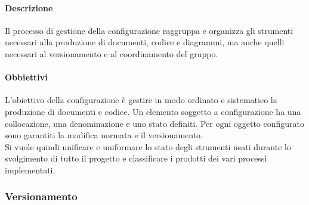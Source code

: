 			\paragraph{Descrizione}
				Il processo di gestione della configurazione raggruppa e organizza gli strumenti necessari alla produzione di documenti, codice e diagrammi, ma anche quelli necessari al versionamento e al coordinamento del gruppo.
			\paragraph{Obbiettivi}
				L’obiettivo della configurazione è gestire in modo ordinato e sistematico la produzione di documenti e codice. Un elemento soggetto a configurazione ha una collocazione, una denominazione e uno stato definiti. Per ogni oggetto configurato sono garantiti la modifica normata e il versionamento. \\
				Si vuole quindi unificare e uniformare lo stato degli strumenti usati durante lo svolgimento di tutto il progetto e classificare i prodotti dei vari processi implementati.
		\subsubsection{Versionamento}
